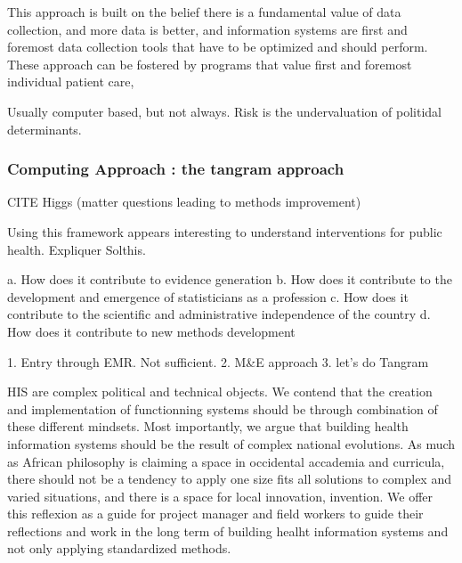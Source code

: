 This approach is built on the belief there is a fundamental value of data collection, and more data is better, and information systems are first and foremost data collection tools that have to be optimized and should perform. These approach can be fostered by programs that value first and foremost individual patient care,

Usually computer based, but not always. Risk is the undervaluation of politidal determinants.

\subsubsection{Computing Approach : the tangram approach}

\cite{wagenaar_using_2016}
CITE Higgs (matter questions leading to methods improvement)






Using this framework appears interesting to understand interventions for public health. Expliquer Solthis.

a. How does it contribute to evidence generation
b. How does it contribute to the development and emergence of statisticians as a profession
c. How does it contribute to the scientific and administrative independence of the country
d. How does it contribute to new methods development


1. Entry through EMR. Not sufficient.
2. M&E approach
3. let's do Tangram

HIS are complex political and technical objects. We contend that the creation and implementation of functionning systems should be through combination of these different mindsets. Most importantly, we argue that building health information systems should be the result of complex national evolutions. As much as African philosophy is claiming a space in occidental accademia and curricula, there should not be a tendency to apply one size fits all solutions to complex and varied situations, and there is a space for local innovation, invention. We offer this reflexion as a guide for project manager and field workers to guide their reflections and work in the long term of building healht information systems and not only applying standardized methods.

